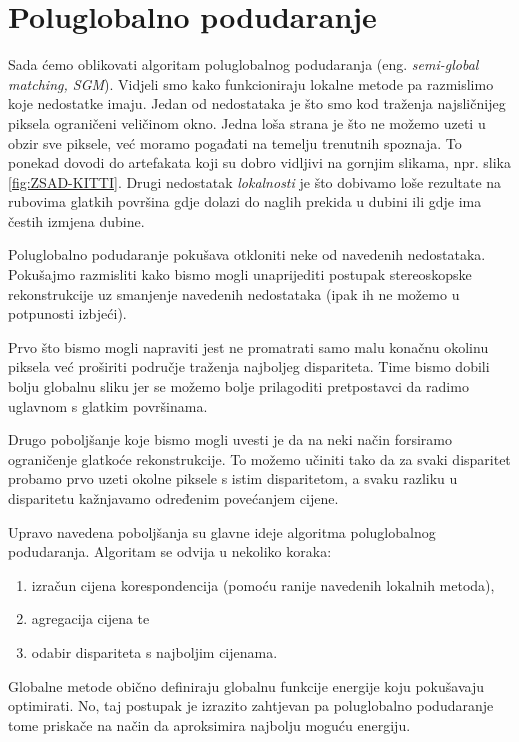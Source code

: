 \documentclass[utf8, zavrsni, numeric]{fer}
\begin{document}
\chapter{Poluglobalno podudaranje}

Sada ćemo oblikovati algoritam poluglobalnog podudaranja (eng. {\sl semi-global matching, SGM}).
Vidjeli smo kako funkcioniraju lokalne metode pa razmislimo koje nedostatke imaju. Jedan od nedostataka je što
smo kod traženja najsličnijeg piksela ograničeni veličinom okno. Jedna loša strana je što ne možemo uzeti u obzir sve piksele, već moramo pogađati na temelju trenutnih spoznaja.
To ponekad dovodi do artefakata koji su dobro vidljivi na gornjim slikama, npr. slika \ref{fig:ZSAD-KITTI}.
Drugi nedostatak {\sl lokalnosti} je što dobivamo loše rezultate na rubovima glatkih površina
gdje dolazi do naglih prekida u dubini ili gdje ima čestih izmjena dubine.

Poluglobalno podudaranje pokušava otkloniti neke od navedenih nedostataka. Pokušajmo razmisliti kako bismo mogli unaprijediti postupak stereoskopske rekonstrukcije uz smanjenje navedenih nedostataka (ipak ih ne možemo u potpunosti izbjeći).

Prvo što bismo mogli napraviti jest ne promatrati samo malu konačnu okolinu piksela već proširiti područje traženja najboljeg dispariteta. Time bismo dobili bolju globalnu sliku jer se možemo bolje prilagoditi pretpostavci da radimo uglavnom s glatkim površinama.

Drugo poboljšanje koje bismo mogli uvesti je da na neki način forsiramo ograničenje glatkoće rekonstrukcije.
To možemo učiniti tako da za svaki disparitet probamo prvo uzeti okolne piksele s istim disparitetom, a svaku razliku u disparitetu kažnjavamo određenim povećanjem cijene.

Upravo navedena poboljšanja su glavne ideje algoritma poluglobalnog podudaranja. Algoritam se odvija u nekoliko koraka:
\begin{enumerate}
  \item izračun cijena korespondencija (pomoću ranije navedenih lokalnih metoda),
  \item agregacija cijena te
  \item odabir dispariteta s najboljim cijenama.
\end{enumerate}

Globalne metode obično definiraju globalnu funkcije energije koju pokušavaju optimirati.
No, taj postupak je izrazito zahtjevan pa poluglobalno podudaranje tome priskače na način
da aproksimira najbolju moguću energiju.
\end{document}
